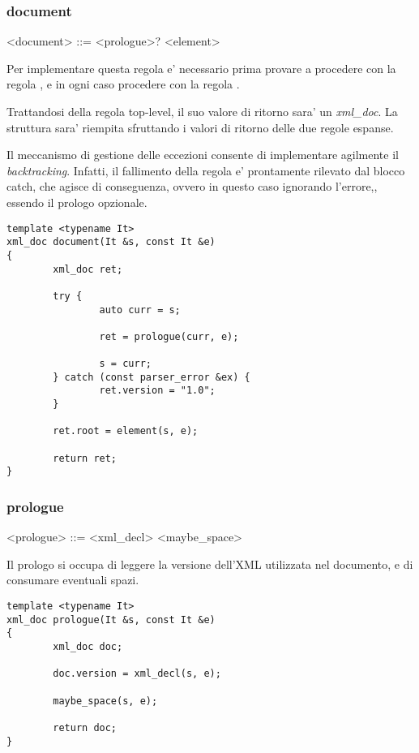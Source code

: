 \documentclass[italian,a4paper]{article}
\begin{document}
\subsubsection{document}

\begin{grammar}
	<document> ::= <prologue>? <element>
\end{grammar}

Per implementare questa regola e' necessario prima provare a procedere con la
regola , e in ogni caso procedere con la regola
.

Trattandosi della regola top-level, il suo valore di ritorno sara' un
\emph{xml\_doc}. La struttura sara' riempita sfruttando i valori di ritorno
delle due regole espanse.

Il meccanismo di gestione delle eccezioni consente di implementare agilmente il
\emph{backtracking}. Infatti, il fallimento della regola  e'
prontamente rilevato dal blocco catch, che agisce di conseguenza, ovvero in
questo caso ignorando l'errore,, essendo il prologo opzionale.

\begin{verbatim}
template <typename It>
xml_doc document(It &s, const It &e)
{
        xml_doc ret;

        try {
                auto curr = s;

                ret = prologue(curr, e);

                s = curr;
        } catch (const parser_error &ex) {
                ret.version = "1.0";
        }

        ret.root = element(s, e);

        return ret;
}
\end{verbatim}

\subsubsection{prologue}

\begin{grammar}
	<prologue> ::= <xml\_decl> <maybe\_space>
\end{grammar}

Il prologo si occupa di leggere la versione dell'XML utilizzata nel documento, e
di consumare eventuali spazi.

\begin{verbatim}
template <typename It>
xml_doc prologue(It &s, const It &e)
{
        xml_doc doc;

        doc.version = xml_decl(s, e);

        maybe_space(s, e);

        return doc;
}
\end{verbatim}
\end{document}
